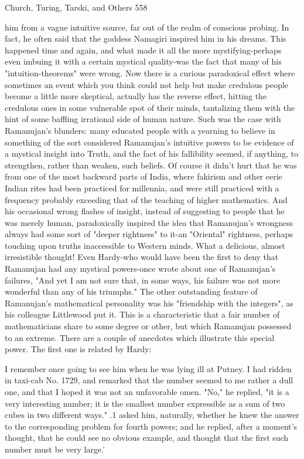 {Church, Turing, Tarski, and Others                                                     558

him from a vague intuitive source, far out of the realm of conscious probing. In fact, he
often said that the goddess Namagiri inspired him in his dreams. This happened time and
again, and what made it all the more mystifying-perhaps even imbuing it with a certain
mystical quality-was the fact that many of his "intuition-theorems" were wrong. Now
there is a curious paradoxical effect where sometimes an event which you think could not
help but make credulous people become a little more skeptical, actually has the reverse
effect, hitting the credulous ones in some vulnerable spot of their minds, tantalizing them
with the hint of some baffling irrational side of human nature. Such was the case with
Ramanujan's blunders: many educated people with a yearning to believe in something of
the sort considered Ramanujan's intuitive powers to be evidence of a mystical insight into
Truth, and the fact of his fallibility seemed, if anything, to strengthen, rather than
weaken, such beliefs.
        Of course it didn't hurt that he was from one of the most backward parts of India,
where fakirism and other eerie Indian rites had been practiced for millennia, and were
still practiced with a frequency probably exceeding that of the teaching of higher
mathematics. And his occasional wrong flashes of insight, instead of suggesting to people
that he was merely human, paradoxically inspired the idea that Ramanujan's wrongness
always had some sort of "deeper rightness" to it-an "Oriental" rightness, perhaps touching
upon truths inaccessible to Western minds. What a delicious, almost irresistible thought!
Even Hardy-who would have been the first to deny that Ramanujan had any mystical
powers-once wrote about one of Ramanujan's failures, "And yet I am not sure that, in
some ways, his failure was not more wonderful than any of his triumphs."
        The other outstanding feature of Ramanujan's mathematical personality was his
"friendship with the integers", as his colleague Littlewood put it. This is a characteristic
that a fair number of mathematicians share to some degree or other, but which
Ramanujan possessed to an extreme. There are a couple of anecdotes which illustrate this
special power. The first one is related by Hardy:

   I remember once going to see him when he was lying ill at Putney. I had ridden in
   taxi-cab No. 1729, and remarked that the number seemed to me rather a dull one,
   and that I hoped it was not an unfavorable omen. "No," he replied, "it is a very
   interesting number; it is the smallest number expressible as a sum of two cubes in
   two different ways." .1 asked him, naturally, whether he knew the answer to the
   corresponding problem for fourth powers; and he replied, after a moment's
   thought, that he could see no obvious example, and thought that the first such
   number must be very large.'

}
